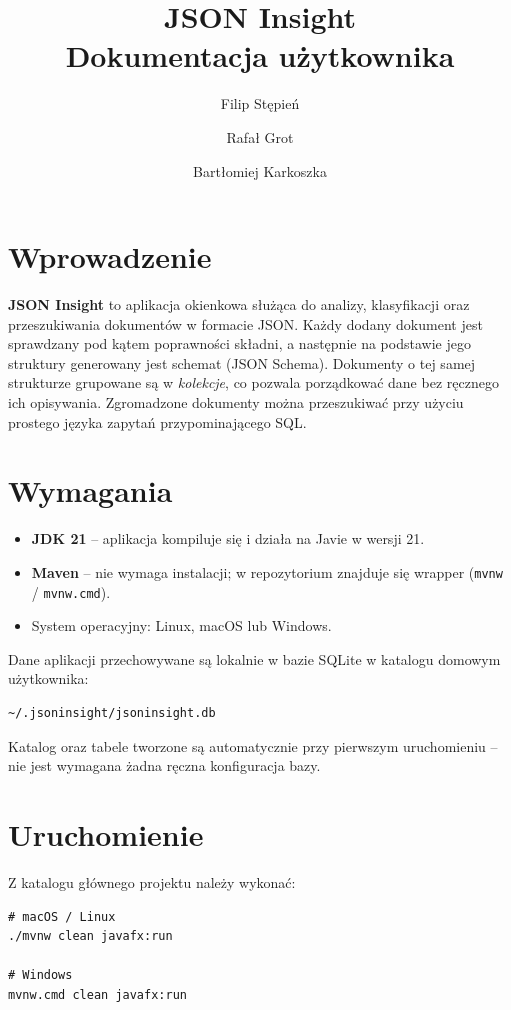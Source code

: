 \documentclass[a4paper,12pt]{article}
\title{JSON Insight \\ \large Dokumentacja użytkownika}
\author{Filip Stępień \and Rafał Grot \and Bartłomiej Karkoszka}
\date{}
\begin{document}
\maketitle
\tableofcontents
\newpage

\section{Wprowadzenie}

\textbf{JSON Insight} to aplikacja okienkowa służąca do analizy, klasyfikacji oraz
przeszukiwania dokumentów w formacie JSON. Każdy dodany dokument jest sprawdzany pod
kątem poprawności składni, a następnie na podstawie jego struktury generowany jest
schemat (JSON Schema). Dokumenty o tej samej strukturze grupowane są w \emph{kolekcje},
co pozwala porządkować dane bez ręcznego ich opisywania. Zgromadzone dokumenty można
przeszukiwać przy użyciu prostego języka zapytań przypominającego SQL.

\section{Wymagania}

\begin{itemize}[noitemsep]
  \item \textbf{JDK 21} -- aplikacja kompiluje się i działa na Javie w wersji 21.
  \item \textbf{Maven} -- nie wymaga instalacji; w repozytorium znajduje się wrapper
        (\texttt{mvnw} / \texttt{mvnw.cmd}).
  \item System operacyjny: Linux, macOS lub Windows.
\end{itemize}

Dane aplikacji przechowywane są lokalnie w bazie SQLite w katalogu domowym użytkownika:

\begin{lstlisting}
~/.jsoninsight/jsoninsight.db
\end{lstlisting}

Katalog oraz tabele tworzone są automatycznie przy pierwszym uruchomieniu --
nie jest wymagana żadna ręczna konfiguracja bazy.

\section{Uruchomienie}

Z katalogu głównego projektu należy wykonać:

\begin{lstlisting}
# macOS / Linux
./mvnw clean javafx:run

# Windows
mvnw.cmd clean javafx:run
\end{lstlisting}
\end{document}
